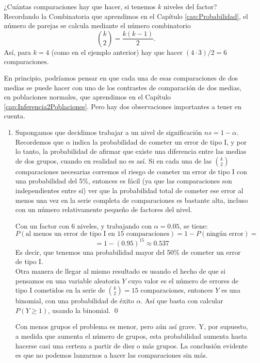 ¿Cuántas comparaciones hay que hacer, si tenemos $k$ niveles del factor? Recordando la Combinatoria que aprendimos en el Capítulo \ref{cap:Probabilidad}, el número de parejas se calcula mediante el número combinatorio
    \[\binom{k}{2}=\dfrac{k(k-1)}{2}.\]
Así, para $k=4$ (como en el ejemplo anterior) hay que hacer $(4\cdot 3)/2=6$ comparaciones.

En principio, podríamos pensar en que cada una de esas comparaciones de dos medias se puede hacer con uno de los contrastes de comparación de dos medias, en poblaciones normales, que aprendimos en el Capítulo \ref{cap:Inferencia2Poblaciones}.  Pero hay dos observaciones importantes a tener en cuenta.

\begin{enumerate}
  \item Supongamos que decidimos trabajar a un nivel de significación $ns=1-\alpha$. Recordemos que $\alpha$ indica la probabilidad de cometer un error de tipo I, y por lo tanto, la probabilidad de afirmar que existe una diferencia entre las medias de dos grupos, cuando en realidad no es así. Si en cada una de las $\binom{k}{2}$ comparaciones necesarias corremos el riesgo de cometer un error de tipo I con una probabilidad del 5\%, entonces es fácil (ya que las comparaciones son independientes entre sí) ver que la probabilidad total de cometer ese error al menos una vez en la serie completa de comparaciones es bastante alta, incluso con un número relativamente pequeño de factores del nivel.
      \begin{ejemplo}
      Con un factor con $6$ niveles, y trabajando con $\alpha=0.05$, se tiene:
        \[P(\mbox{al menos un error de tipo I en 15 comparaciones})=1-P(\mbox{ningún error})=\]
        \[=1-(0.95)^{15}\approx 0.537\]
      Es decir, que tenemos una probabilidad mayor del 50\% de cometer un error de tipo I.\\
      Otra manera de llegar al mismo resultado es usando el hecho de que si pensamos en una variable aleatoria $Y$ cuyo valor es el número de errores de tipo I cometidos en la serie de $\binom{k}{2}=15$ comparaciones, entonces $Y$ es una binomial, con una probabilidad de éxito $\alpha$. Así que basta con calcular $P(Y\geq 1)$, usando la binomial.
      \qed
      \end{ejemplo}
     Con menos grupos el problema es menor, pero aún así grave. Y, por supuesto, a medida que aumenta el número de grupos, esta probabilidad aumenta hasta hacerse casi una certeza a partir de diez o más grupos. La conclusión evidente es que no podemos lanzarnos a hacer las comparaciones sin más.


\end{enumerate}
